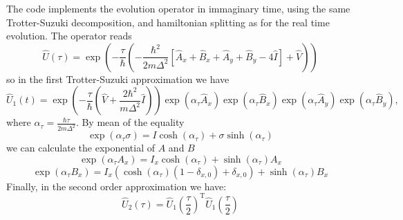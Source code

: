 The code implements the evolution operator in immaginary time, using the same Trotter-Suzuki decomposition, and hamiltonian splitting as for the real time evolution. The operator reads
\begin{equation}
\hat{U}(\tau) =   \exp\left(-\frac{\tau}{\hbar} \left( -\frac{\hbar^2}{2 m \Delta^2} \left[ \hat{A}_x + \hat{B}_x + \hat{A}_y + \hat{B}_y - 4 \hat{I} \right] + \hat{V} \right) \right)
\end{equation} 
so in the first Trotter-Suzuki approximation we have
\begin{equation}
\hat{U}_1(t) = \exp\left(-\frac{\tau}{\hbar}\left(\hat{V} + \frac{2 \hbar^2}{m \Delta^2} \hat{I}\right) \right) \exp\left(\alpha_\tau \hat{A}_x \right) \exp\left( \alpha_\tau \hat{B}_x \right) \exp\left( \alpha_\tau \hat{A}_y \right) \exp\left( \alpha_\tau \hat{B}_y \right),
\end{equation}
where $\alpha_\tau = \frac{\hbar \tau}{2m\Delta^2}$. By mean of the equality
\begin{equation}
\exp( \alpha_\tau \sigma) = I \cosh(\alpha_\tau) +  \sigma \sinh(\alpha_\tau)
\end{equation}
we can calculate the exponential of $A$ and $B$
\begin{equation}
\exp\left( \alpha_\tau A_x \right) = I_x \cosh(\alpha_\tau) + \sinh(\alpha_\tau) A_x
\end{equation}
\begin{equation}
\exp\left( \alpha_\tau B_x \right) = I_x (\cosh(\alpha_\tau)(1-\delta_{x,0}) + \delta_{x,0}) +  \sinh(\alpha_\tau) B_x
\end{equation}
Finally, in the second order approximation we have:
\begin{equation}
\hat{U}_2(\tau) = \hat{U}_1\left( \frac{\tau}{2} \right)^\mathrm{T} \hat{U}_1\left(\frac{\tau}{2}\right)
\end{equation}

